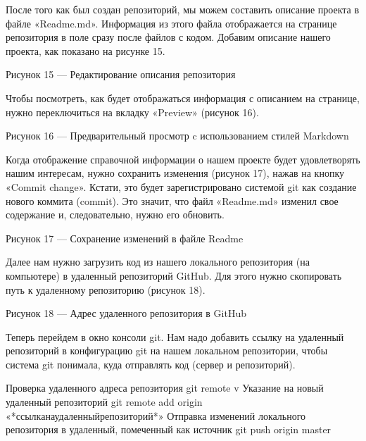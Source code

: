 \documentclass[letterpaper,10pt,russian]{sphinxmanual}
\begin{document}
\sphinxAtStartPar
После того как был создан репозиторий, мы можем составить описание проекта в файле «Readme.md». Информация из этого файла отображается на странице репозитория в поле сразу после файлов с кодом. Добавим описание нашего проекта, как показано на рисунке 15.

\sphinxAtStartPar
{}

\sphinxAtStartPar
Рисунок 15 — Редактирование описания репозитория

\sphinxAtStartPar
Чтобы посмотреть, как будет отображаться информация с описанием на странице, нужно переключиться на вкладку «Preview» (рисунок 16).

\sphinxAtStartPar
{}

\sphinxAtStartPar
Рисунок 16 — Предварительный просмотр c использованием стилей Markdown

\sphinxAtStartPar
Когда отображение справочной информации о нашем проекте будет удовлетворять нашим интересам, нужно сохранить изменения (рисунок 17), нажав на кнопку «Commit change». Кстати, это будет зарегистрировано системой git как создание нового коммита (commit). Это значит, что файл «Readme.md» изменил свое содержание и, следовательно, нужно его обновить.

\sphinxAtStartPar
{}

\sphinxAtStartPar
Рисунок 17 — Сохранение изменений в файле Readme

\sphinxAtStartPar
Далее нам нужно загрузить код из нашего локального репозитория (на компьютере) в удаленный репозиторий GitHub. Для этого нужно скопировать путь к удаленному репозиторию (рисунок 18).

\sphinxAtStartPar
{}

\sphinxAtStartPar
Рисунок 18 — Адрес удаленного репозитория в GitHub

\sphinxAtStartPar
Теперь перейдем в окно консоли git. Нам надо добавить ссылку на удаленный репозиторий в конфигурацию git на нашем локальном репозитории, чтобы система git понимала, куда отправлять код (сервер и репозиторий).

\begin{sphinxVerbatim}[commandchars=\\\{\}]
\PYGZsh{} Проверка удаленного адреса репозитория
git remote \PYGZhy{}v
\PYGZsh{} Указание на новый удаленный репозиторий
git remote add origin «*ссылка\PYGZus{}на\PYGZus{}удаленный\PYGZus{}репозиторий*»
\PYGZsh{} Отправка изменений локального репозитория в удаленный, помеченный как источник
git push origin master
\end{sphinxVerbatim}
\end{document}
